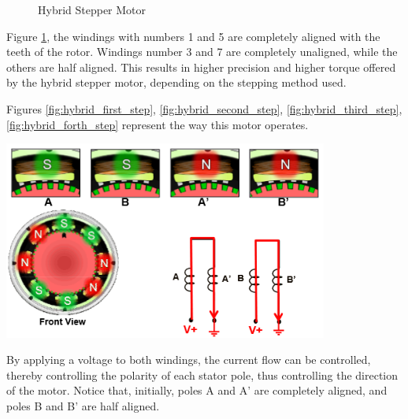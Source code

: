 \begin{figure}[htp]
    \centering%
    \hfill%
    \caption{Hybrid Stepper Motor}
    \label{fig:stepper}
\end{figure}
\newpage
Figure \ref{fig:stepper}, the windings with numbers 1 and 5 are completely aligned with the teeth 
of the rotor. Windings number 3 and 7 are completely unaligned, while the others are half aligned. 
This results in higher precision and higher torque offered by the hybrid stepper motor, depending 
on the stepping method used.

Figures \ref{fig:hybrid_first_step},  \ref{fig:hybrid_second_step}, \ref{fig:hybrid_third_step},
\ref{fig:hybrid_forth_step} 
represent the way this motor operates.

\begin{center}
	\includegraphics[width=0.8\textwidth]{figures/move/motor32}
	\label{fig:hybrid_first_step}
\end{center}
By applying a voltage to both windings, the current flow can be controlled, thereby controlling the 
polarity of each stator pole, thus controlling the direction of the motor. Notice that, initially, 
poles A and A’ are completely aligned, and poles B and B’ are half aligned. 

